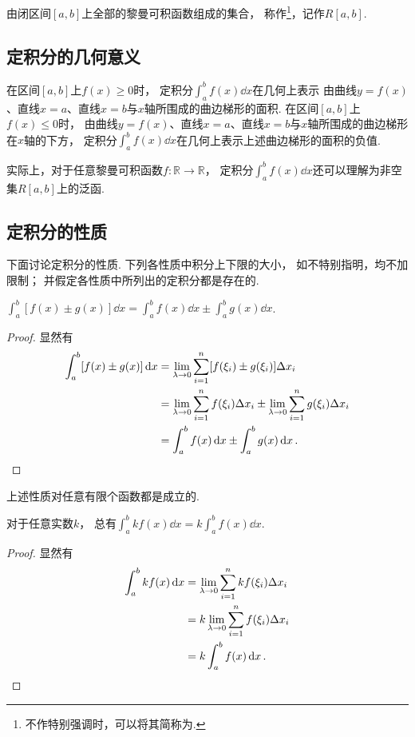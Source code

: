 \begin{definition}\label{definition:函数族.黎曼可积函数族}
由闭区间\([a,b]\)上全部的黎曼可积函数组成的集合，
称作\footnote{%
不作特别强调时，可以将其简称为.%
}，记作\(R[a,b]\).
\end{definition}

\subsection{定积分的几何意义}
在区间\([a,b]\)上\(f(x) \geq 0\)时，
定积分\(\int_a^b f(x) \dd{x}\)在几何上表示
由曲线\(y=f(x)\)、直线\(x=a\)、直线\(x=b\)与\(x\)轴所围成的曲边梯形的面积.
在区间\([a,b]\)上\(f(x) \leq 0\)时，
由曲线\(y=f(x)\)、直线\(x=a\)、直线\(x=b\)与\(x\)轴所围成的曲边梯形在\(x\)轴的下方，
定积分\(\int_a^b f(x) \dd{x}\)在几何上表示上述曲边梯形的面积的负值.

实际上，对于任意黎曼可积函数\(f\colon \mathbb{R} \to \mathbb{R}\)，
定积分\(\int_a^b f(x) \dd{x}\)还可以理解为非空集\(R[a,b]\)上的泛函.

\subsection{定积分的性质}
下面讨论定积分的性质.
下列各性质中积分上下限的大小，
如不特别指明，均不加限制；
并假定各性质中所列出的定积分都是存在的.
\begin{property}\label{theorem:定积分.定积分性质1}
\(\int_a^b [f(x) \pm g(x)] \dd{x}
= \int_a^b f(x) \dd{x} \pm \int_a^b g(x) \dd{x}\).
\begin{proof}
显然有\begin{align*}
	\int_a^b [f(x) \pm g(x)] \dd{x}
	&= \lim_{\lambda\to0}
		\sum_{i=1}^n [f(\xi_i) \pm g(\xi_i)] \Delta x_i \\
	&= \lim_{\lambda\to0}
		\sum_{i=1}^n f(\xi_i) \Delta x_i
		\pm
		\lim_{\lambda\to0}
		\sum_{i=1}^n g(\xi_i) \Delta x_i \\
	&= \int_a^b f(x) \dd{x} \pm \int_a^b g(x) \dd{x}.
	\qedhere
\end{align*}
\end{proof}
\end{property}
上述性质对任意有限个函数都是成立的.

\begin{property}\label{theorem:定积分.定积分性质2}
对于任意实数\(k\)，
总有\(\int_a^b k f(x) \dd{x}
=k\int_a^b f(x) \dd{x}\).
\begin{proof}
显然有\begin{align*}
	\int_a^b k f(x) \dd{x}
	&= \lim_{\lambda\to0}
		\sum_{i=1}^n k f(\xi_i) \Delta x_i \\
	&= k \lim_{\lambda\to0}
		\sum_{i=1}^n f(\xi_i) \Delta x_i \\
	&= k \int_a^b f(x) \dd{x}.
	\qedhere
\end{align*}
\end{proof}
\end{property}

